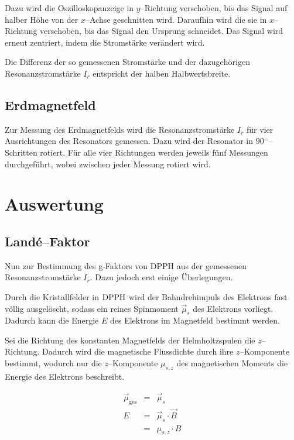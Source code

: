 \documentclass[12pt,a4paper]{scrartcl}
\numberwithin{equation}{section} %
\begin{document}
Dazu wird die Oszilloskopanzeige in $y$--Richtung verschoben, bis das Signal auf halber Höhe von der $x$--Achse geschnitten wird.  Daraufhin wird die sie in $x$--Richtung verschoben, bis das Signal den Ursprung schneidet. Das Signal wird erneut zentriert, indem die Stromstärke verändert wird.

Die Differenz der so gemessenen Stromstärke und der dazugehörigen Resonanzstromstärke $I_r$ entspricht der halben Halbwertsbreite.

\subsection{Erdmagnetfeld}
\label{durchfuxfchrung:Erdmagnetfeld}
Zur Messung des Erdmagnetfelds wird die Resonanzstromstärke $I_r$ für vier Ausrichtungen des Resonators gemessen. Dazu wird der Resonator in $90 \mathrm{\, ^\circ}$--Schritten rotiert. Für alle vier Richtungen werden jeweils fünf Messungen durchgeführt, wobei zwischen jeder Messung rotiert wird.

\clearpage
\hypertarget{auswertung}{\section{Auswertung}\label{auswertung}}

\subsection{Landé--Faktor}
\label{auswertung:Landé--Faktor}

Nun zur Bestimmung des g-Faktors von DPPH aus der gemessenen Resonanzstromstärke $I_r$. Dazu jedoch erst einige Überlegungen.

Durch die Kristallfelder in $\ce{DPPH}$ wird der Bahndrehimpuls des Elektrons fast völlig ausgelöscht, sodass ein reines Spinmoment $\vec{\mu}_s$ des Elektrons vorliegt. Dadurch kann die Energie $E$ des Elektrons im Magnetfeld bestimmt werden.

Sei die Richtung des konstanten Magnetfelds der Helmholtzspulen die $z$--Richtung. Dadurch wird die magnetische Flussdichte durch ihre $z$--Komponente bestimmt, wodurch nur die $z$--Komponente $\mu_{s,z}$ des magnetischen Moments die Energie des Elektrons beschreibt.

\begin{eqnarray}
	\vec{\mu}_\mathrm{ges} &=& \vec{\mu}_s \\
	E &=& \vec{\mu}_s \cdot \vec{B} \\
		&=& \mu_{s,z} \cdot B
\end{eqnarray}
\end{document}
